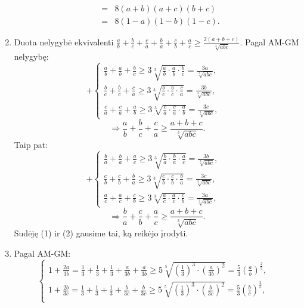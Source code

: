 \begin{enumerate}
\begin{eqnarray*}
    &=&8(a+b)(a+c)(b+c)\\ &=&8(1-a)(1-b)(1-c). \end{eqnarray*}
\item
    Duota nelygybė ekvivalenti $\frac{a}{b}+\frac{b}{c}+\frac{c}{a}+\frac{b}{a}+\frac{c}{b}+\frac{a}{c}\geq\frac{2(a+b+c)}{\sqrt[3]{abc}}$.
    Pagal AM-GM nelygybę: $$+\left\{\begin{array}{ll}
    \frac{a}{b}+\frac{a}{b}+\frac{b}{c}\geq3\sqrt[3]{\frac{a}{b}\cdot\frac{a}{b}\cdot\frac{b}{c}}=\frac{3a}{\sqrt[3]{abc}},&\\
    \frac{b}{c}+\frac{b}{c}+\frac{c}{a}\geq3\sqrt[3]{\frac{b}{c}\cdot\frac{b}{c}\cdot\frac{c}{a}}=\frac{3b}{\sqrt[3]{abc}},&\\
    \frac{c}{a}+\frac{c}{a}+\frac{a}{b}\geq3\sqrt[3]{\frac{c}{a}\cdot\frac{c}{a}\cdot\frac{a}{b}}=\frac{3c}{\sqrt[3]{abc}},&
    \end{array}\right.$$ \begin{equation*}
    \Rightarrow\frac{a}{b}+\frac{b}{c}+\frac{c}{a}\geq\frac{a+b+c}{\sqrt[3]{abc}}.\tag{1}\end{equation*}
    Taip pat: $$+\left\{\begin{array}{ll}
    \frac{b}{a}+\frac{b}{a}+\frac{a}{c}\geq3\sqrt[3]{\frac{b}{a}\cdot\frac{b}{a}\cdot\frac{a}{c}}=\frac{3b}{\sqrt[3]{abc}},&\\
    \frac{c}{b}+\frac{c}{b}+\frac{b}{a}\geq3\sqrt[3]{\frac{c}{b}\cdot\frac{c}{b}\cdot\frac{b}{a}}=\frac{3c}{\sqrt[3]{abc}},&\\
    \frac{a}{c}+\frac{a}{c}+\frac{c}{b}\geq3\sqrt[3]{\frac{a}{c}\cdot\frac{a}{c}\cdot\frac{c}{b}}=\frac{3a}{\sqrt[3]{abc}},&
    \end{array}\right.$$ \begin{equation*}
    \Rightarrow\frac{b}{a}+\frac{c}{b}+\frac{a}{c}\geq\frac{a+b+c}{\sqrt[3]{abc}}.\tag{2}\end{equation*}
    Sudėję (1) ir (2) gausime tai, ką reikėjo įrodyti.
\item
    Pagal AM-GM: $$\left\{\begin{array}{ll}
    1+\frac{2a}{3b}=\frac{1}{3}+\frac{1}{3}+\frac{1}{3}+\frac{a}{3b}+\frac{a}{3b}\geq5\sqrt[5]{\left(\frac{1}{3}\right)^3\cdot\left(\frac{a}{3b}\right)^2}=\frac{5}{3}\left(\frac{a}{b}\right)^{\frac{2}{5}},&\\
    1+\frac{2b}{3c}=\frac{1}{3}+\frac{1}{3}+\frac{1}{3}+\frac{b}{3c}+\frac{b}{3c}\geq5\sqrt[5]{\left(\frac{1}{3}\right)^3\cdot\left(\frac{b}{3c}\right)^2}=\frac{5}{3}\left(\frac{b}{c}\right)^{\frac{2}{5}},&\\

\end{array}$$
\end{enumerate}
